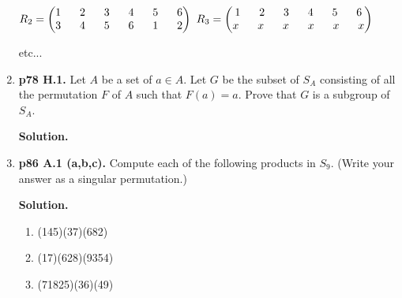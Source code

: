 \documentclass[11pt]{article}
\begin{document}
\begin{enumerate}
	$R_2 = \begin{pmatrix}
		1 \hspace{6mm} 2 \hspace{6mm} 3 \hspace{6mm} 4 \hspace{6mm} 5 \hspace{6mm} 6 \\
		3 \hspace{6mm} 4 \hspace{6mm} 5 \hspace{6mm} 6 \hspace{6mm} 1 \hspace{6mm} 2
	\end{pmatrix}$
	$R_3 = \begin{pmatrix}
		1 \hspace{6mm} 2 \hspace{6mm} 3 \hspace{6mm} 4 \hspace{6mm} 5 \hspace{6mm} 6 \\
		x \hspace{6mm} x \hspace{6mm} x \hspace{6mm} x \hspace{6mm} x \hspace{6mm} x
	\end{pmatrix}$
	
	etc...

\item {\bfseries p78 H.1.} Let $A$ be a set of $a \in A$. Let $G$ be the subset of $S_A$ consisting of all the permutation $F$ of $A$ such that $F(a) = a$. Prove that $G$ is a subgroup of $S_A$.
  
	{\bfseries Solution.}
  
\newpage

\item {\bfseries p86 A.1 (a,b,c).} Compute each of the following products in $S_9$. (Write your answer as a singular permutation.)
  
	{\bfseries Solution.}
	
	\begin{enumerate}
  
		\item (145)(37)(682)
		
		\item (17)(628)(9354)
		
		\item (71825)(36)(49)
  

\end{enumerate}
\end{enumerate}
\end{document}
